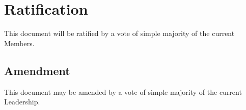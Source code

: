 \section{Ratification}
\label{ratification}

This document will be ratified by a vote of simple majority of the current Members.

\subsection{Amendment}
\label{ratification:amendment}

This document may be amended by a vote of simple majority of the current Leadership.